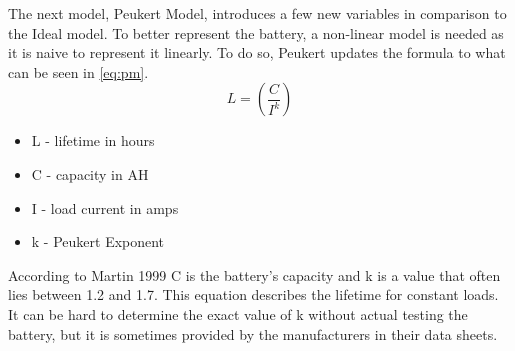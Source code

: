 The next model, Peukert Model, introduces a few new variables in comparison to the Ideal model. 
To better represent the battery, a non-linear model is needed as it is naive to represent it linearly.
To do so, Peukert updates the formula to what can be seen in \cref{eq:pm}. 
\begin{equation}\label{eq:pm}
L=(\frac{C}{I^k})
\end{equation}
\begin{itemize}
	\item L - lifetime in hours
	\item C - capacity in AH
	\item I - load current in amps
	\item k - Peukert Exponent
\end{itemize}

According to Martin 1999\cite{peu} C is the battery's capacity and k is a value that often lies between 1.2 and 1.7.
This equation describes the lifetime for constant loads.
It can be hard to determine the exact value of k without actual testing the battery, but it is sometimes provided by the manufacturers in their data sheets.

